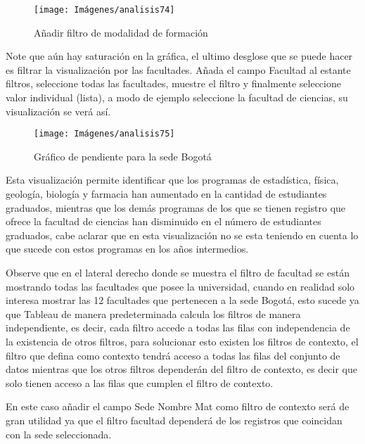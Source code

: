 \documentclass[
]{book}
\begin{document}
\begin{figure}

{\centering \texttt{[image: Imágenes/analisis74]} 

}

\caption{Añadir filtro de modalidad de formación}\label{fig:paso2graficopendientebogota-fig}
\end{figure}

Note que aún hay saturación en la gráfica, el ultimo desglose que se puede hacer es filtrar la visualización por las facultades. Añada el campo Facultad al estante filtros, seleccione todas las facultades, muestre el filtro y finalmente seleccione valor individual (lista), a modo de ejemplo seleccione la facultad de ciencias, su visualización se verá así.

\begin{figure}

{\centering \texttt{[image: Imágenes/analisis75]} 

}

\caption{Gráfico de pendiente para la sede Bogotá}\label{fig:graficopendientebogota-fig}
\end{figure}

Esta visualización permite identificar que los programas de estadística, física, geología, biología y farmacia han aumentado en la cantidad de estudiantes graduados, mientras que los demás programas de los que se tienen registro que ofrece la facultad de ciencias han disminuido en el número de estudiantes graduados, cabe aclarar que en esta visualización no se esta teniendo en cuenta lo que sucede con estos programas en los años intermedios.

Observe que en el lateral derecho donde se muestra el filtro de facultad se están mostrando todas las facultades que posee la universidad, cuando en realidad solo interesa mostrar las 12 facultades que pertenecen a la sede Bogotá, esto sucede ya que Tableau de manera predeterminada calcula los filtros de manera independiente, es decir, cada filtro accede a todas las filas con independencia de la existencia de otros filtros, para solucionar esto existen los filtros de contexto, el filtro que defina como contexto tendrá acceso a todas las filas del conjunto de datos mientras que los otros filtros dependerán del filtro de contexto, es decir que solo tienen acceso a las filas que cumplen el filtro de contexto.

En este caso añadir el campo Sede Nombre Mat como filtro de contexto será de gran utilidad ya que el filtro facultad dependerá de los registros que coincidan con la sede seleccionada.
\end{document}
